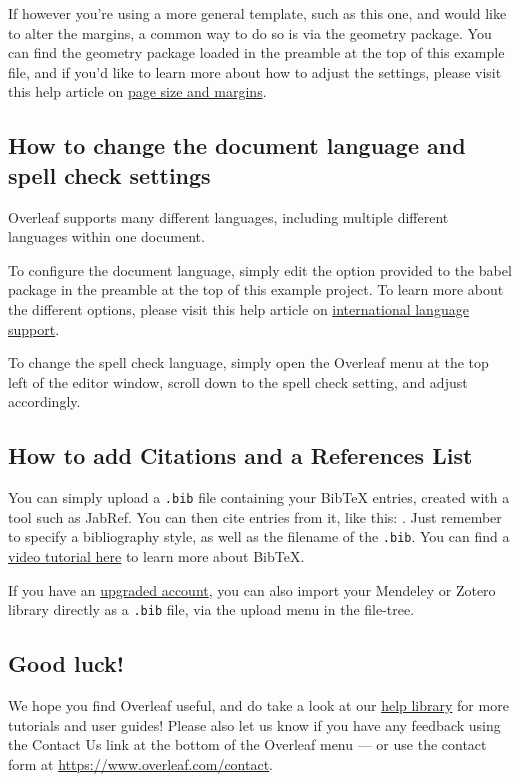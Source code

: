 \documentclass{article}
\begin{document}
    If however you're using a more general template, such as this one, and would like to alter the margins, a common way to do so is via the geometry package. You can find the geometry package loaded in the preamble at the top of this example file, and if you'd like to learn more about how to adjust the settings, please visit this help article on \href{https://www.overleaf.com/learn/latex/page_size_and_margins}{page size and margins}.

    \subsection{How to change the document language and spell check settings}

    Overleaf supports many different languages, including multiple different languages within one document.

    To configure the document language, simply edit the option provided to the babel package in the preamble at the top of this example project. To learn more about the different options, please visit this help article on \href{https://www.overleaf.com/learn/latex/International_language_support}{international language support}.

    To change the spell check language, simply open the Overleaf menu at the top left of the editor window, scroll down to the spell check setting, and adjust accordingly.

    \subsection{How to add Citations and a References List}

    You can simply upload a \verb|.bib| file containing your BibTeX entries, created with a tool such as JabRef. You can then cite entries from it, like this: \cite{greenwade93}. Just remember to specify a bibliography style, as well as the filename of the \verb|.bib|. You can find a \href{https://www.overleaf.com/help/97-how-to-include-a-bibliography-using-bibtex}{video tutorial here} to learn more about BibTeX.

    If you have an \href{https://www.overleaf.com/user/subscription/plans}{upgraded account}, you can also import your Mendeley or Zotero library directly as a \verb|.bib| file, via the upload menu in the file-tree.

    \subsection{Good luck!}

    We hope you find Overleaf useful, and do take a look at our \href{https://www.overleaf.com/learn}{help library} for more tutorials and user guides! Please also let us know if you have any feedback using the Contact Us link at the bottom of the Overleaf menu --- or use the contact form at \url{https://www.overleaf.com/contact}.

    
    
\end{document}
